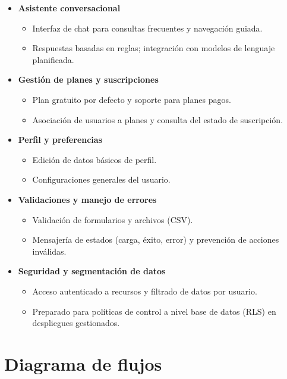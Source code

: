\begin{itemize}
    \item \textbf{Asistente conversacional}
    \begin{itemize}
        \item Interfaz de chat para consultas frecuentes y navegación guiada.
        \item Respuestas basadas en reglas; integración con modelos de lenguaje planificada.
    \end{itemize}

    \item \textbf{Gestión de planes y suscripciones}
    \begin{itemize}
        \item Plan gratuito por defecto y soporte para planes pagos.
        \item Asociación de usuarios a planes y consulta del estado de suscripción.
    \end{itemize}

    \item \textbf{Perfil y preferencias}
    \begin{itemize}
        \item Edición de datos básicos de perfil.
        \item Configuraciones generales del usuario.
    \end{itemize}

    \item \textbf{Validaciones y manejo de errores}
    \begin{itemize}
        \item Validación de formularios y archivos (CSV).
        \item Mensajería de estados (carga, éxito, error) y prevención de acciones inválidas.
    \end{itemize}

    \item \textbf{Seguridad y segmentación de datos}
    \begin{itemize}
        \item Acceso autenticado a recursos y filtrado de datos por usuario.
        \item Preparado para políticas de control a nivel base de datos (RLS) en despliegues gestionados.
    \end{itemize}
\end{itemize}

\vspace{1cm}
\section{Diagrama de flujos}

